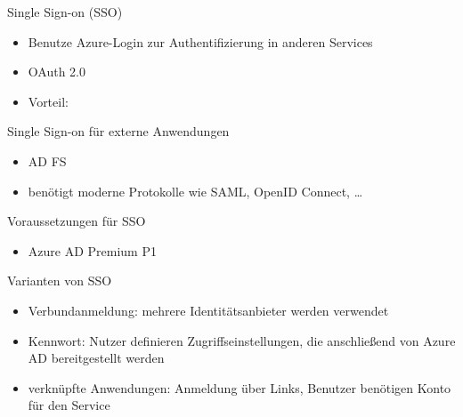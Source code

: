 
\begin{flashcard}[Definition]{Single Sign-on (SSO)}
  \begin{itemize}
    \item Benutze Azure-Login zur Authentifizierung in anderen Services
    \item OAuth 2.0
    \item Vorteil: 
  \end{itemize}
\end{flashcard}

\begin{flashcard}[Definition]{Single Sign-on für externe Anwendungen}
  \begin{itemize}
    \item AD FS
    \item benötigt moderne Protokolle wie SAML, OpenID Connect, \ldots
  \end{itemize}
\end{flashcard}

\begin{flashcard}[Definition]{Voraussetzungen für SSO}
  \begin{itemize}
    \item Azure AD Premium P1
  \end{itemize}
\end{flashcard}

\begin{flashcard}[Definition]{Varianten von SSO}
  \begin{itemize}
    \item Verbundanmeldung: mehrere Identitätsanbieter werden verwendet
    \item Kennwort: Nutzer definieren Zugriffseinstellungen, die anschließend von Azure AD bereitgestellt werden
    \item verknüpfte Anwendungen: Anmeldung über Links, Benutzer benötigen Konto für den Service
  \end{itemize}
\end{flashcard}

